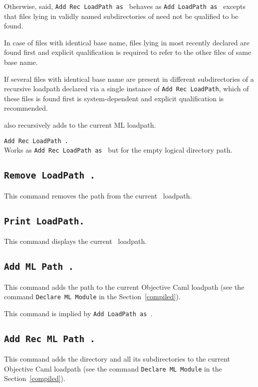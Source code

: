 Otherwise, said, {\tt Add Rec LoadPath {\str} as {\dirpath}} behaves
as {\tt Add LoadPath {\str} as {\dirpath}} excepts that files lying in
validly named subdirectories of {\str} need not be qualified to be
found.

In case of files with identical base name, files lying in most recently
declared {\dirpath} are found first and explicit qualification is
required to refer to the other files of same base name.

If several files with identical base name are present in different
subdirectories of a recursive loadpath declared via a single instance of
{\tt Add Rec LoadPath}, which of these files is found first is
system-dependent and explicit qualification is recommended.

 also recursively adds {\str} to the current ML loadpath.

\begin{Variants}
\item {\tt Add Rec LoadPath {\str}.}\\
Works as {\tt Add Rec LoadPath {\str} as {\dirpath}} but for the empty logical directory path.
\end{Variants}

\subsection[\tt Remove LoadPath {\str}.]{\tt Remove LoadPath {\str}.}
This command removes the path {\str} from the current \Coq\ loadpath.

\subsection[\tt Print LoadPath.]{\tt Print LoadPath.}
This command displays the current \Coq\ loadpath.

\subsection[\tt Add ML Path {\str}.]{\tt Add ML Path {\str}.}
This command adds the path {\str} to the current Objective Caml loadpath (see
the command {\tt Declare ML Module} in the Section~\ref{compiled}).

\Rem This command is implied by {\tt Add LoadPath {\str} as {\dirpath}}.

\subsection[\tt Add Rec ML Path {\str}.]{\tt Add Rec ML Path {\str}.}
This command adds the directory {\str} and all its subdirectories 
to the current Objective Caml loadpath (see
the command {\tt Declare ML Module} in the Section~\ref{compiled}).

